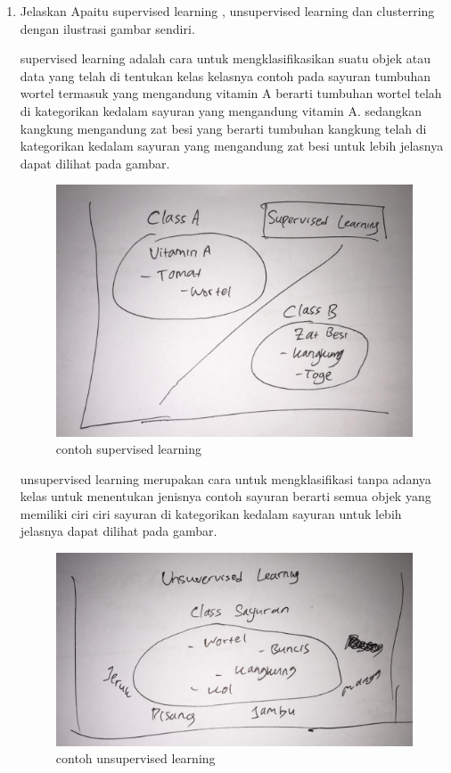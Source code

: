 \begin{enumerate}
\item Jelaskan Apaitu supervised learning , unsupervised learning dan clusterring dengan ilustrasi gambar sendiri.\par
supervised learning adalah cara untuk mengklasifikasikan suatu objek atau data yang telah di tentukan kelas kelasnya contoh pada sayuran tumbuhan wortel termasuk yang mengandung vitamin A berarti tumbuhan wortel telah di kategorikan kedalam sayuran yang mengandung vitamin A. sedangkan kangkung mengandung zat besi yang berarti tumbuhan kangkung telah di kategorikan kedalam sayuran yang mengandung zat besi untuk lebih jelasnya dapat dilihat pada gambar.\par
\begin{figure}[ht]
\centering
\includegraphics[scale=0.2]{figures/1174042/chapter2/1,2.jpeg}
\caption{contoh supervised learning}
\label{contoh}
\end{figure}

unsupervised learning merupakan cara untuk mengklasifikasi tanpa adanya kelas untuk menentukan jenisnya contoh sayuran berarti semua objek yang memiliki ciri ciri sayuran di kategorikan kedalam sayuran untuk lebih jelasnya dapat dilihat pada gambar.\par
\begin{figure}[ht]
\centering
\includegraphics[scale=0.2]{figures/1174042/chapter2/1,3.jpeg}
\caption{contoh unsupervised learning}
\label{contoh}
\end{figure}


\end{enumerate}
